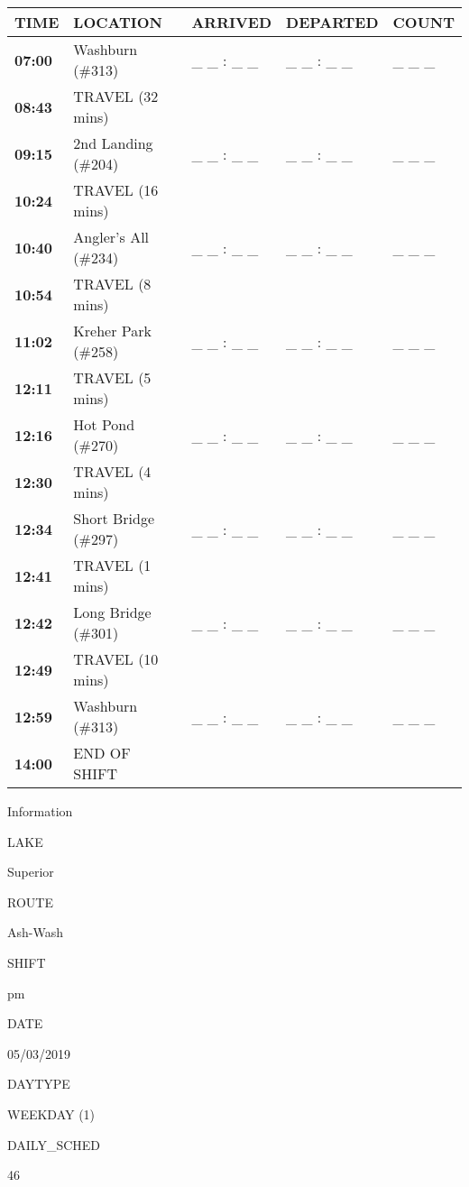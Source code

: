 \documentclass[]{article}
\begin{document}
\begin{tabular}{>{\bfseries}lllll}
\toprule
\textbf{TIME} & \textbf{LOCATION} & \textbf{ARRIVED} & \textbf{DEPARTED} & \textbf{COUNT}\\
\midrule
07:00 & Washburn (\#313) & \_ \_ : \_ \_ & \_ \_ : \_ \_ & \_ \_ \_\\
08:43 & TRAVEL (32 mins) &  &  & \\
09:15 & 2nd Landing (\#204) & \_ \_ : \_ \_ & \_ \_ : \_ \_ & \_ \_ \_\\
10:24 & TRAVEL (16 mins) &  &  & \\
10:40 & Angler's All (\#234) & \_ \_ : \_ \_ & \_ \_ : \_ \_ & \_ \_ \_\\
10:54 & TRAVEL (8 mins) &  &  & \\
11:02 & Kreher Park (\#258) & \_ \_ : \_ \_ & \_ \_ : \_ \_ & \_ \_ \_\\
12:11 & TRAVEL (5 mins) &  &  & \\
12:16 & Hot Pond (\#270) & \_ \_ : \_ \_ & \_ \_ : \_ \_ & \_ \_ \_\\
12:30 & TRAVEL (4 mins) &  &  & \\
12:34 & Short Bridge (\#297) & \_ \_ : \_ \_ & \_ \_ : \_ \_ & \_ \_ \_\\
12:41 & TRAVEL (1 mins) &  &  & \\
12:42 & Long Bridge (\#301) & \_ \_ : \_ \_ & \_ \_ : \_ \_ & \_ \_ \_\\
12:49 & TRAVEL (10 mins) &  &  & \\
12:59 & Washburn (\#313) & \_ \_ : \_ \_ & \_ \_ : \_ \_ & \_ \_ \_\\
14:00 & END OF SHIFT &  &  & \\
\bottomrule
\end{tabular}\newpage

Information

LAKE

Superior

ROUTE

Ash-Wash

SHIFT

pm

DATE

05/03/2019

DAYTYPE

WEEKDAY (1)

DAILY\_SCHED

46

\vspace{24pt}
\end{document}
